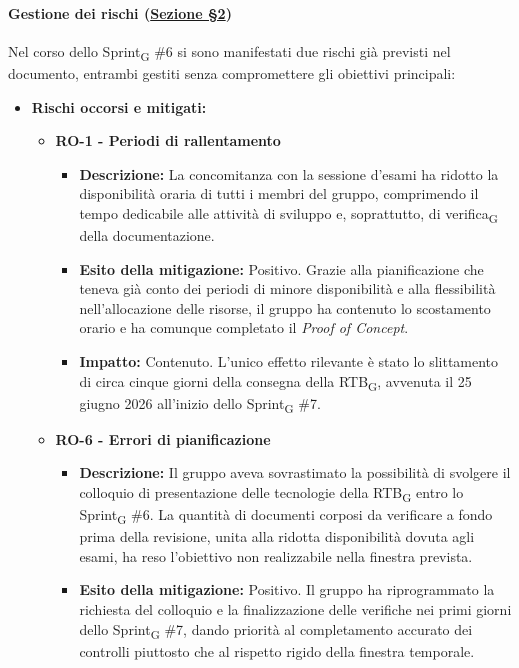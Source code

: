 ﻿\documentclass[a4paper, 10pt, colorlinks=true, linkcolor=black, urlcolor=blue, citecolor=blue, hidelinks]{article}
\begin{document}
\paragraph{Gestione dei rischi (\hyperref[tab:gestione-rischi]{Sezione \S2})}
Nel corso dello Sprint\textsubscript{G} \#6 si sono manifestati due rischi già previsti nel documento, entrambi gestiti senza compromettere gli obiettivi principali:
\begin{itemize}
    \item \textbf{Rischi occorsi e mitigati:}
    \begin{itemize}
        \item \textbf{RO-1 - Periodi di rallentamento}
        \begin{itemize}
            \item \textbf{Descrizione:} La concomitanza con la sessione d'esami ha ridotto la disponibilità oraria di tutti i membri del gruppo, comprimendo il tempo dedicabile alle attività di sviluppo e, soprattutto, di verifica\textsubscript{G} della documentazione.
            \item \textbf{Esito della mitigazione:} Positivo. Grazie alla pianificazione che teneva già conto dei periodi di minore disponibilità e alla flessibilità nell'allocazione delle risorse, il gruppo ha contenuto lo scostamento orario e ha comunque completato il \textit{Proof of Concept}.
            \item \textbf{Impatto:} Contenuto. L'unico effetto rilevante è stato lo slittamento di circa cinque giorni della consegna della RTB\textsubscript{G}, avvenuta il 25 giugno 2026 all'inizio dello Sprint\textsubscript{G} \#7.
        \end{itemize}
        \item \textbf{RO-6 - Errori di pianificazione}
        \begin{itemize}
            \item \textbf{Descrizione:} Il gruppo aveva sovrastimato la possibilità di svolgere il colloquio di presentazione delle tecnologie della RTB\textsubscript{G} entro lo Sprint\textsubscript{G} \#6. La quantità di documenti corposi da verificare a fondo prima della revisione, unita alla ridotta disponibilità dovuta agli esami, ha reso l'obiettivo non realizzabile nella finestra prevista.
            \item \textbf{Esito della mitigazione:} Positivo. Il gruppo ha riprogrammato la richiesta del colloquio e la finalizzazione delle verifiche nei primi giorni dello Sprint\textsubscript{G} \#7, dando priorità al completamento accurato dei controlli piuttosto che al rispetto rigido della finestra temporale.

\end{itemize}
\end{itemize}
\end{itemize}
\end{document}
